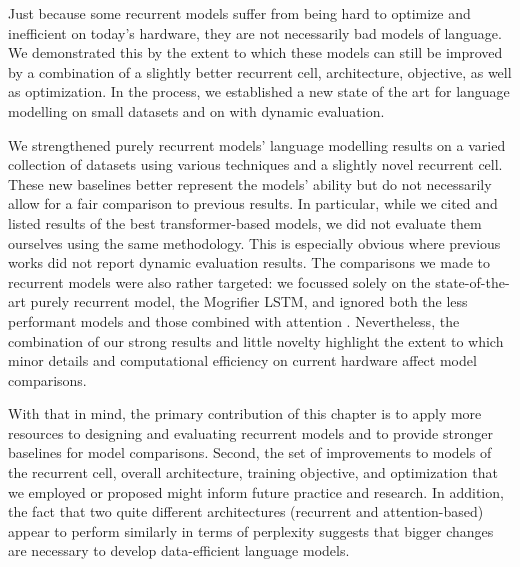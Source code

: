 \mglconclusion
Just because some recurrent models suffer from being hard to optimize and inefficient on today's hardware, they are not necessarily bad models of language.
We demonstrated this by the extent to which these models can still be improved by a combination of a slightly better recurrent cell, architecture, objective, as well as optimization.
In the process, we established a new state of the art for language modelling on small datasets and on \enwik with dynamic evaluation.

We strengthened purely recurrent models' language modelling results on a varied collection of datasets using various techniques and a slightly novel recurrent cell.
These new baselines better represent the models' ability but do not necessarily allow for a fair comparison to previous results.
In particular, while we cited and listed results of the best transformer-based models, we did not evaluate them ourselves using the same methodology.
This is especially obvious where previous works did not report dynamic evaluation results.
The comparisons we made to recurrent models were also rather targeted: we focussed solely on the state-of-the-art purely recurrent model, the Mogrifier LSTM, and ignored both the less performant models and those combined with attention \citep{merity2019single,DBLP:journals/corr/abs-2102-12459}.
Nevertheless, the combination of our strong results and little novelty highlight the extent to which minor details and computational efficiency on current hardware affect model comparisons.

With that in mind, the primary contribution of this chapter is to apply more resources to designing and evaluating recurrent models and to provide stronger baselines for model comparisons.
Second, the set of improvements to models of the recurrent cell, overall architecture, training objective, and optimization that we employed or proposed might inform future practice and research.
In addition, the fact that two quite different architectures (recurrent and attention-based) appear to perform similarly in terms of perplexity suggests that bigger changes are necessary to develop data-efficient language models.

\mglsep
